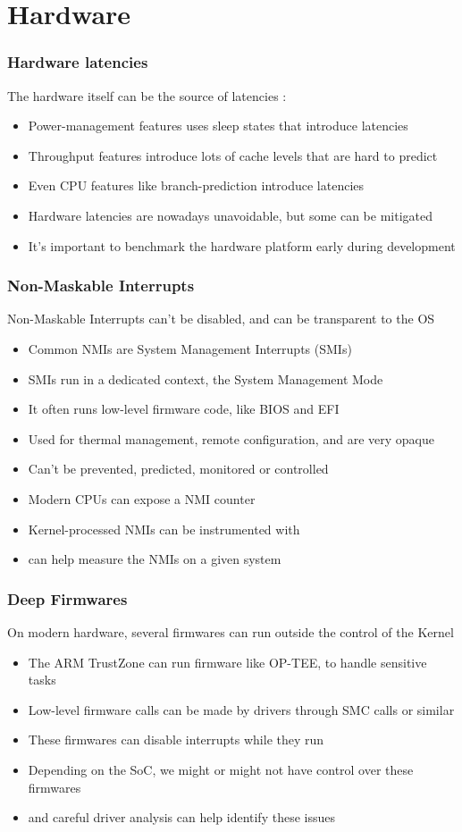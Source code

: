 \section{Hardware}

\begin{frame}
	\frametitle{Hardware latencies}
	The hardware itself can be the source of latencies :
	\begin{itemize}
		\item Power-management features uses sleep states that introduce latencies
		\item Throughput features introduce lots of cache levels that are hard to predict
		\item Even CPU features like branch-prediction introduce latencies
		\item Hardware latencies are nowadays unavoidable, but some can be mitigated
		\item It's important to benchmark the hardware platform early during development
	\end{itemize}
\end{frame}

\begin{frame}
	\frametitle{Non-Maskable Interrupts}
	Non-Maskable Interrupts can't be disabled, and can be transparent to the OS
	\begin{itemize}
		\item Common NMIs are System Management Interrupts (SMIs)
		\item SMIs run in a dedicated context, the System Management Mode
		\item It often runs low-level firmware code, like BIOS and EFI
		\item Used for thermal management, remote configuration, and are very opaque
		\item Can't be prevented, predicted, monitored or controlled
		\item Modern CPUs can expose a NMI counter
		\item Kernel-processed NMIs can be instrumented with 
		\item {} can help measure the NMIs on a given system
	\end{itemize}
\end{frame}

\begin{frame}
	\frametitle{Deep Firmwares}
	On modern hardware, several firmwares can run outside the control of the Kernel
	\begin{itemize}
		\item The ARM TrustZone can run firmware like OP-TEE, to handle sensitive tasks
		\item Low-level firmware calls can be made by drivers through SMC calls or similar
		\item These firmwares can disable interrupts while they run
		\item Depending on the SoC, we might or might not have control over these firmwares
		\item {} and careful driver analysis can help identify these issues
	\end{itemize}
\end{frame}

